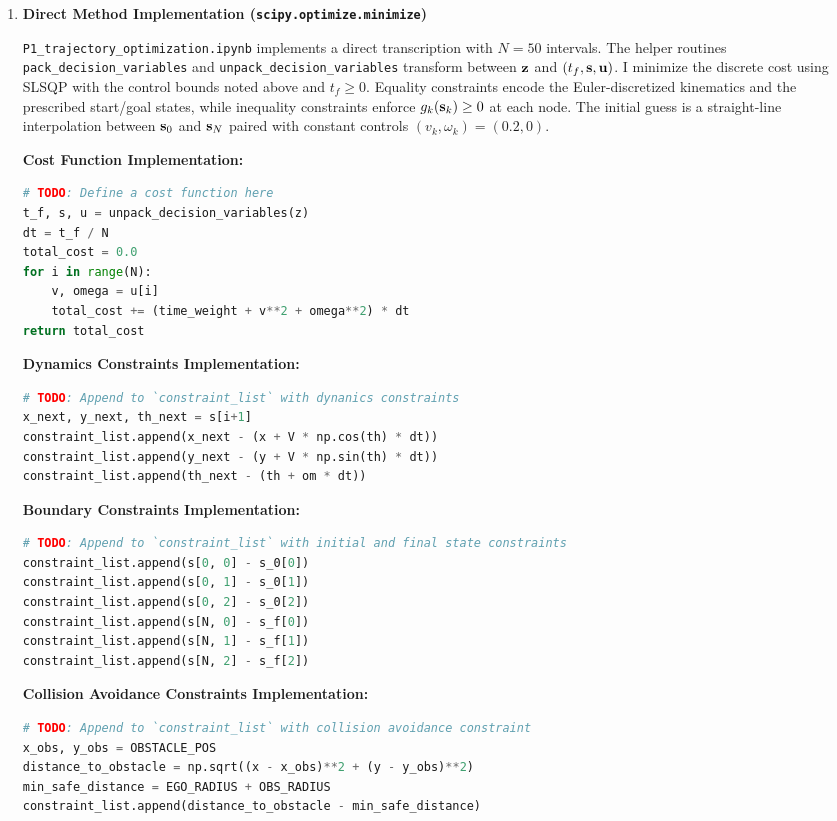 \documentclass [11pt]{article}
\begin{document}
\begin{enumerate}[label=(\roman*)]
        \item \textbf{Direct Method Implementation (\texttt{scipy.optimize.minimize})}

        \texttt{P1\_trajectory\_optimization.ipynb} implements a direct transcription with $N = 50$ intervals. The helper routines \texttt{pack\_decision\_variables} and \texttt{unpack\_decision\_variables} transform between ${\bf z}$ and $(t_f, {\bf s}, {\bf u})$. I minimize the discrete cost using SLSQP with the control bounds noted above and $t_f \ge 0$. Equality constraints encode the Euler-discretized kinematics and the prescribed start/goal states, while inequality constraints enforce $g_k({\bf s}_k) \ge 0$ at each node. The initial guess is a straight-line interpolation between ${\bf s}_0$ and ${\bf s}_N$ paired with constant controls $(v_k, \omega_k) = (0.2, 0)$.

        \textbf{Cost Function Implementation:}
\begin{lstlisting}[language=Python]
# TODO: Define a cost function here
t_f, s, u = unpack_decision_variables(z)
dt = t_f / N
total_cost = 0.0
for i in range(N):
    v, omega = u[i]
    total_cost += (time_weight + v**2 + omega**2) * dt
return total_cost
\end{lstlisting}

        \textbf{Dynamics Constraints Implementation:}
\begin{lstlisting}[language=Python]
# TODO: Append to `constraint_list` with dynanics constraints
x_next, y_next, th_next = s[i+1]
constraint_list.append(x_next - (x + V * np.cos(th) * dt))
constraint_list.append(y_next - (y + V * np.sin(th) * dt))
constraint_list.append(th_next - (th + om * dt))
\end{lstlisting}

        \textbf{Boundary Constraints Implementation:}
\begin{lstlisting}[language=Python]
# TODO: Append to `constraint_list` with initial and final state constraints
constraint_list.append(s[0, 0] - s_0[0])
constraint_list.append(s[0, 1] - s_0[1])
constraint_list.append(s[0, 2] - s_0[2])
constraint_list.append(s[N, 0] - s_f[0])
constraint_list.append(s[N, 1] - s_f[1])
constraint_list.append(s[N, 2] - s_f[2])
\end{lstlisting}

        \textbf{Collision Avoidance Constraints Implementation:}
\begin{lstlisting}[language=Python]
# TODO: Append to `constraint_list` with collision avoidance constraint
x_obs, y_obs = OBSTACLE_POS
distance_to_obstacle = np.sqrt((x - x_obs)**2 + (y - y_obs)**2)
min_safe_distance = EGO_RADIUS + OBS_RADIUS
constraint_list.append(distance_to_obstacle - min_safe_distance)
\end{lstlisting}


\end{enumerate}
\end{document}
